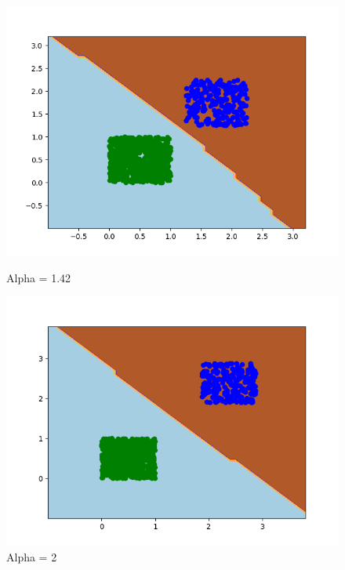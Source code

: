 \documentclass{article}
\begin{document}
\begin{figure}[!htb]
\begin{minipage}{0.24\textwidth}
		\includegraphics[width=1\linewidth]{../unequalpriors/this26.png}
		\caption{Alpha = 1.42}
	\end{minipage}
	\begin{minipage}{0.24\textwidth}
		\centering
		\includegraphics[width=1\linewidth]{../unequalpriors/this31.png}
		\caption{Alpha = 2}
	\end{minipage}
\end{figure}
\end{document}
